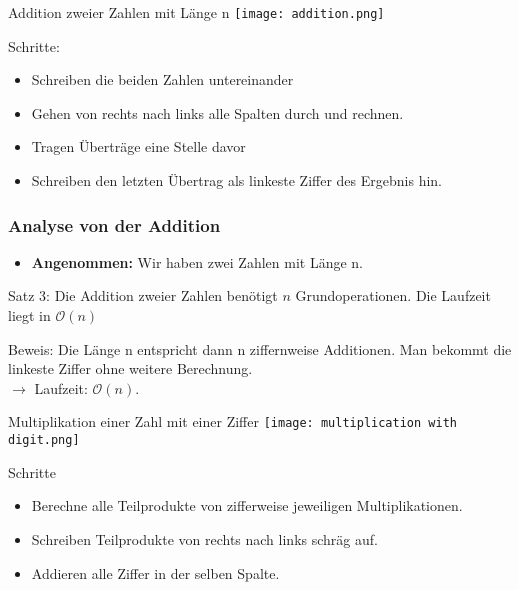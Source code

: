 \documentclass{beamer}
\begin{document}
\begin{frame}{Addition zweier Zahlen mit Länge n}
\texttt{[image: addition.png]}\\

\begin{block}{Schritte:}
    \begin{itemize}
      \item[1)] Schreiben die beiden Zahlen untereinander
      \item[2)] Gehen von rechts nach links alle Spalten durch und rechnen.
      \item[3)] Tragen Überträge eine Stelle davor
      \item[4)] Schreiben den letzten Übertrag als linkeste Ziffer des Ergebnis hin.
  \end{itemize}
\end{block}
 
\end{frame}

\begin{frame}
\frametitle{Analyse von der Addition}
\begin{itemize}
    \item \textbf{Angenommen: } Wir haben zwei Zahlen mit Länge n. 
\end{itemize}
\begin{block}{Satz 3: }
Die Addition zweier Zahlen benötigt $n$ Grundoperationen. Die Laufzeit liegt in $\mathcal{O}(n)$
\end{block}
 
\begin{block}{Beweis: }
Die Länge n entspricht dann n ziffernweise Additionen. Man bekommt die linkeste Ziffer ohne weitere Berechnung. \\
$ \rightarrow $ Laufzeit:  $\mathcal{O}(n)$.
\end{block}
\end{frame}

\begin{frame}{Multiplikation einer Zahl mit einer Ziffer}
\texttt{[image: multiplication with digit.png]}\\
\begin{block}{Schritte}
    \begin{itemize}
        \item[1)] Berechne alle Teilprodukte von zifferweise jeweiligen Multiplikationen.
        \item[2)] Schreiben Teilprodukte von rechts nach links schräg auf.
        \item[3)] Addieren alle Ziffer in der selben Spalte. 
    \end{itemize}
\end{block}
\end{frame}
\end{document}
